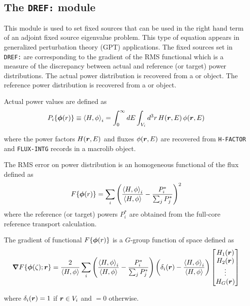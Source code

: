 \subsection{The {\tt DREF:} module}\label{sect:DREFData}

This module is used to set fixed sources that can be used in the right hand term of an adjoint
fixed source eigenvalue problem. This type of equation appears in generalized perturbation theory (GPT) applications.
The fixed sources set in {\tt DREF:} are corresponding to the gradient of the RMS functional which is a measure of
the discrepancy between actual and reference (or target) power distributions. The actual power distribution is recovered from 
a  or  object. The reference power distribution is recovered from 
a  or  object.

\vskip 0.08cm

Actual power values are defined as
$$
P_i\{\bff(\phi)(r)\}\equiv \left< H , \phi \right>_i=\int_0^\infty dE \int_{V_i} d^3r \, H(\bff(r),E) \, \phi(\bff(r),E)
$$

\noindent where the power factors $H(\bff(r),E)$ and fluxes $\phi(\bff(r),E)$ are recovered from {\tt H-FACTOR} and 
{\tt FLUX-INTG} records in a {\sc macrolib} object.

\vskip 0.08cm

The RMS error on power distribution is an homogeneous functional of the flux defined as
$$
F\{\bff(\phi)(r)\}=\sum_i \left({\left< H , \phi \right>_i\over \left< H , \phi \right>} - {P^*_i\over \sum_j P^*_j} \right)^2
$$
\noindent where the reference (or target) powers $P^*_i$ are obtained from the full-core reference transport calculation.

\vskip 0.08cm

The gradient of functional $F\{\bff(\phi)(r)\}$ is a $G$-group function of space defined as
\begin{align*}
\bff(\nabla)F\{\bff(\phi)(\zeta);\bff(r)\}={2\over \left< H , \phi \right>} \sum_i  \left({\left< H , \phi \right>_i\over \left< H , \phi \right>} -
{P^*_i\over \sum_j P^*_j}\right)\left( \delta_i(\bff(r))-{\left< H , \phi \right>_i\over \left< H , \phi \right>} \right) \left[\begin{matrix}H_1(\bff(r))\cr H_2(\bff(r)) \cr \vdots \cr H_G(\bff(r)) \end{matrix}\right]
\end{align*}

\noindent where $\delta_i(\bff(r))=1$ if $\bff(r) \in V_i$ and $=0$ otherwise.

